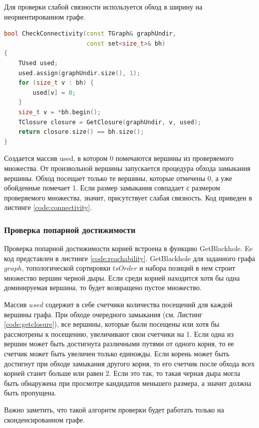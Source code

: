 \documentclass[12pt,a4paper,oneside,openany]{article}
\theoremstyle{definition}
\theoremstyle{lemma}
\theoremstyle{remark}
\begin{document}
Для проверки слабой связности используется обход в ширину на неориентированном графе.

\begin{lstlisting}[language=C++, caption=Проверка слабой связности множества корней, label=code:connectivity]
bool CheckConnectivity(const TGraph& graphUndir,
                       const set<size_t>& bh)
{
    TUsed used;
    used.assign(graphUndir.size(), 1);
    for (size_t v : bh) {
        used[v] = 0;
    }
    size_t v = *bh.begin();
    TClosure closure = GetClosure(graphUndir, v, used);
    return closure.size() == bh.size();
}
\end{lstlisting}

Создается массив used, в котором 0 помечаются вершины из проверяемого множества.
От произвольной вершины запускается процедура обхода замыкания вершины.
Обход посещает только те вершины, которые отмечены 0, а уже обойденные
помечает 1.
Если размер замыкания совпадает с размером проверяемого множества, значит,
присутствует слабая связность. Код приведен в листинге \ref{code:connectivity}.

\subsubsection{Проверка попарной достижимости}\label{subsubsec:reachabilitycheck}

Проверка попарной достижимости корней встроена в функцию GetBlackhole.
Ee код представлен в листинге \ref{code:reachability}.
GetBlackhole для заданного графа $graph$, топологической сортировки $tsOrder$ и набора позиций в нем
строит множество вершин черной дыры. Если среди корней находится хотя бы одна доминируемая вершина,
то будет возвращено пустое множество.

Массив $used$ содержит в себе счетчики количества посещений для каждой вершины графа.
При обходе очередного замыкания (см. Листинг \ref{code:getclosure}), все вершины, которые
были посещены или хотя бы рассмотрены к посещению, увеличивают свои счетчики на 1.
Если одна из вершин может быть достигнута различными путями от одного корня,
то ее счетчик может быть увеличен только единожды. Если корень может быть достигнут
при обходе замыкания другого корня, то его счетчик после обхода всех корней станет больше или равен 2.
Если это так, то такая черная дыра могла быть обнаружена при просмотре кандидатов меньшего размера,
а значит должна быть пропущена.

Важно заметить, что такой алгоритм проверки будет работать только на сконденсированном графе.
\end{document}
